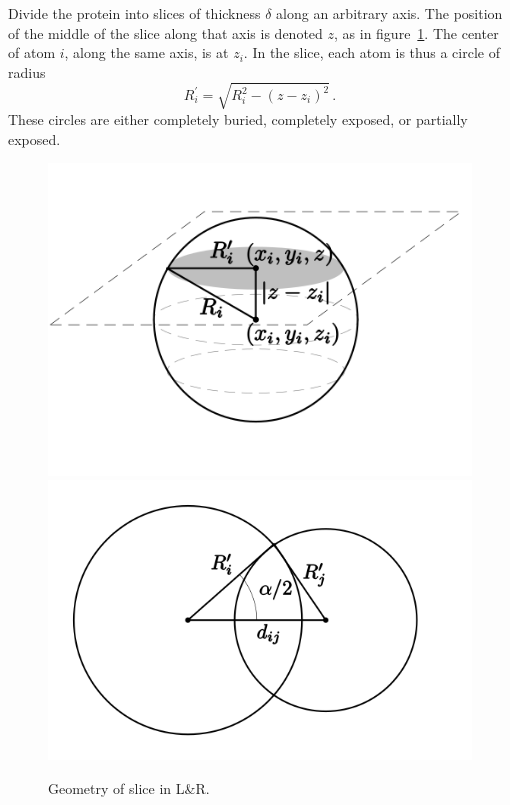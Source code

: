 \documentclass[a4paper,11pt]{article}
\begin{document}
\begin{small}
Divide the protein into slices of thickness $\delta$ along an
arbitrary axis. The position of the middle of the slice along that
axis is denoted $z$, as in figure~\ref{fig:slice}. The center of atom
$i$, along the same axis, is at $z_i$. In the slice, each atom is thus
a circle of radius $$R_i^\prime = \sqrt{R_i^2-(z-z_i)^2}\,.$$ These
circles are either completely buried, completely exposed, or partially
exposed.

\begin{figure}
\includegraphics{fig/lnr_slice}
\includegraphics{fig/lnr_circles}
\caption{Geometry of slice in L\&R.\label{fig:slice}}
\end{figure}


\end{small}
\end{document}
